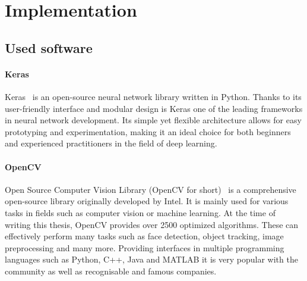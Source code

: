 \chapter{Implementation}

\section{Used software}
\subsubsection{Keras}
Keras~\cite{keras} is an open-source neural network library written in Python. Thanks to its user-friendly interface and modular design is Keras one of the leading frameworks in neural network development. Its simple yet flexible architecture allows for easy prototyping and experimentation, making it an ideal choice for both beginners and experienced practitioners in the field of deep learning.
\subsubsection{OpenCV }
Open Source Computer Vision Library (OpenCV for short)~\cite{opencv} is a comprehensive open-source library originally developed by Intel. It is mainly used for various tasks in fields such as computer vision or machine learning. At the time of writing this thesis, OpenCV provides over 2500 optimized algorithms. These can effectively perform many tasks such as face detection, object tracking, image preprocessing and many more. Providing interfaces in multiple programming languages such as Python, C++, Java and MATLAB it is very popular with the community as well as recognisable and famous companies.





